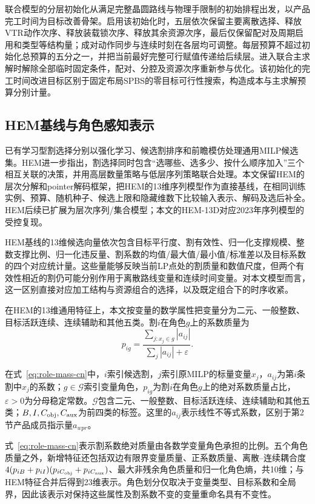 \documentclass[final,5p,times,twocolumn]{elsarticle}
\begin{document}
联合模型的分层初始化从满足完整晶圆路线与物理手限制的初始排程出发，以产品完工时间为目标改善骨架。启用该初始化时，五层依次保留主要离散选择、释放VTR动作次序、释放装载锁次序、释放其余资源次序，最后仅保留配对及周期启用和类型等结构量；成对动作同步与连续时刻在各层均可调整。每层预算不超过初始化总预算的五分之一，并把当前最好完整可行赋值传递给后续层。进入联合主求解时解除全部临时固定条件，配对、分腔及资源次序重新参与优化。该初始化的完工时间改进目标区别于固定布局SPBS的零目标可行性搜索，构造成本与主求解预算分别计量。

\subsection{HEM基线与角色感知表示}

已有学习型割选择分别以强化学习、候选割排序和前瞻模仿处理通用MILP候选集\citep{tang2020cut,huang2022cutranking,paulus2022looking}。HEM进一步指出，割选择同时包含“选哪些、选多少、按什么顺序加入”三个相互关联的决策，并用高层数量策略与低层序列策略联合处理\citep{wang2023hem}。本文保留HEM的层次分解和pointer解码框架，把HEM的13维序列模型作为直接基线，在相同训练实例、预算、随机种子、候选上限和隐藏维数下比较输入表示、解码及选后补全。HEM后续已扩展为层次序列/集合模型\citep{wang2024hemset}；本文的HEM-13D对应2023年序列模型的受控复现。

HEM基线的13维候选向量依次包含目标平行度、割有效性、归一化支撑规模、整数支撑比例、归一化违反量、割系数的均值/最大值/最小值/标准差以及目标系数的四个对应统计量。这些量能够反映当前LP点处的割质量和数值尺度，但两个有效性相近的割仍可能分别作用于离散路线变量和连续时间变量。对本文模型而言，这一区别直接对应加工结构与资源组合的选择，以及既定组合下的时序收紧。

在HEM的13维通用特征上，本文按变量的数学属性把变量分为二元、一般整数、目标活跃连续、连续辅助和其他五类。割$i$在角色$g$上的系数质量为
\begin{equation}
p_{ig}=\frac{\sum_{j:x_j\in g}|a_{ij}|}{\sum_j|a_{ij}|+\varepsilon}.
\label{eq:role-mass-cn}
\end{equation}

在式~\eqref{eq:role-mass-cn}中，$i$索引候选割，$j$索引原MILP的标量变量$x_j$，$a_{ij}$为第$i$条割中$x_j$的系数；$g\in\mathcal G$索引变量角色，$p_{ig}$为割$i$在角色$g$上的绝对系数质量占比，$\varepsilon>0$为分母稳定常数。$\mathcal G$包含二元、一般整数、目标活跃连续、连续辅助和其他五类；$B,I,C_{\rm obj},C_{\rm aux}$为前四类的标签。这里的$a_{ij}$表示线性不等式系数，区别于第2节产品成员指示量$a_{wpr}$。


式~\eqref{eq:role-mass-cn}表示割系数绝对质量由各数学变量角色承担的比例。五个角色质量之外，新增特征还包括双边有限界变量质量、正系数质量、离散--连续耦合度$4(p_{iB}+p_{iI})(p_{iC_{\rm obj}}+p_{iC_{\rm aux}})$、最大非残余角色质量和归一化角色熵，共10维；与HEM特征合并后得到23维表示。角色划分仅取决于变量类型、目标系数和全局界，因此该表示对保持这些属性及割系数不变的变量重命名具有不变性。
\end{document}
